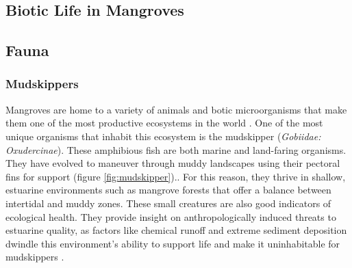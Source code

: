   


\subsection{Biotic Life in Mangroves}
\subsection{Fauna} 

\subsubsection{Mudskippers}

  Mangroves are home to a variety of animals and botic microorganisms that make them one of the most productive ecosystems in the world \citep{kristensen1991benthic}. One of the most unique organisms that inhabit this ecosystem is the mudskipper (\textit{Gobiidae: Oxudercinae}). These amphibious fish are both marine and land-faring organisms. They have evolved to maneuver through muddy landscapes using their pectoral fins for support  (figure \ref{fig:mudskipper}).. For this reason, they thrive in shallow, estuarine environments such as mangrove forests that offer a balance between intertidal and muddy zones. These small creatures are also good indicators of ecological health. They provide insight on anthropologically induced threats to estuarine quality, as factors like chemical runoff and extreme sediment deposition dwindle this environment's ability to support life and make it uninhabitable for mudskippers \citep{polgar2009species}. 

